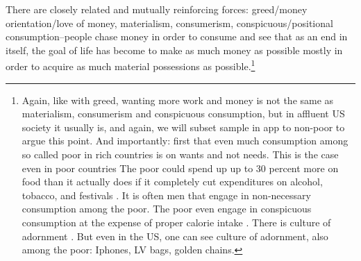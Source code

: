 \documentclass[10pt, letterpaper]{article}
\begin{document}
\begin{spacing}{1.8}
There are closely related and mutually reinforcing forces: greed/money
orientation/love of money, materialism, consumerism, conspicuous/positional
consumption--people chase money in order to consume and see that as an end in
itself, the goal of life has become to make as much money as possible mostly in
order to acquire as much material possessions as possible.\footnote{
Again, like with greed, wanting more work and money is not the same as
materialism, consumerism  and conspicuous consumption, but in affluent US
society it usually is, and again, we will subset sample in app to non-poor to
argue this point. 
%
And importantly: first that even much consumption among so called poor in rich
countries is on wants and not needs. This is the case even in poor countries
The poor could spend up up to 30 percent more on food than it actually does if
it completely cut expenditures on alcohol, tobacco, and festivals \citep{banerjee11}.
It is often men that engage in non-necessary consumption among the poor. %
The poor even engage in conspicuous consumption at the expense of proper calorie
intake \citep{bellet18}. There is culture of adornment
\citep{cordwell2011fabrics,mascia1992tattoo}. But even in the US, one can see
culture of adornment, also among the poor: Iphones, LV bags, golden chains. %
}


\end{spacing}
\end{document}

